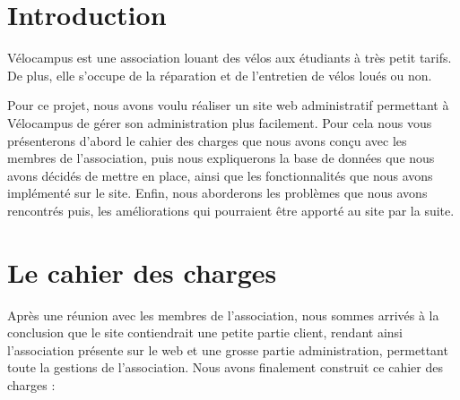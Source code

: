 \documentclass[11pt,a4paper,titlepage]{report}
\begin{document}
\tableofcontents
\chapter*{Introduction}
Vélocampus est une association louant des vélos aux étudiants à très petit tarifs. De plus, elle s’occupe de la réparation et de l'entretien de vélos loués ou non.

Pour ce projet, nous avons voulu réaliser un site web administratif permettant à Vélocampus de gérer son administration plus facilement. Pour cela nous vous présenterons d'abord le cahier des charges que nous avons conçu avec les membres de l'association, puis nous expliquerons la base de données que nous avons décidés de mettre en place, ainsi que les fonctionnalités que nous avons implémenté sur le site. Enfin, nous aborderons les problèmes que nous avons rencontrés puis, les améliorations qui pourraient être apporté au site par la suite.


\chapter{Le cahier des charges}
Après une réunion avec les membres de l'association, nous sommes arrivés à la conclusion que le site contiendrait une petite partie client, rendant ainsi l'association présente sur le web et une grosse partie administration, permettant toute la gestions de l'association. 
Nous avons finalement construit ce cahier des charges :\\
\end{document}
